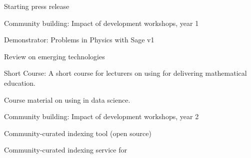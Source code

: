 \begin{workpackage}

\begin{wpdelivs}
\begin{wpdeliv}[due=6,miles=startup,id=press-release-1,dissem=PU,nature=DEC,lead=PS]{Starting press release}\end{wpdeliv}
 \begin{wpdeliv}[due=12,miles=startup,id=workshops-1,dissem=PU,nature=R,lead=PS]{Community building: Impact of development workshops, year 1}\end{wpdeliv}
  \begin{wpdeliv}[due=12,miles=startup,id=ibook3a,dissem=PU,nature=DEM,lead=US]{Demonstrator: Problems in Physics with Sage v1} \end{wpdeliv}
  \begin{wpdeliv}[due=12,miles=startup,id=techno,dissem=PU,nature=R,lead=PS]{Review on emerging technologies} \end{wpdeliv}
 \begin{wpdeliv}[due=18,miles=proto1,id=short-course,dissem=PU,nature=DEC,lead=USH]{Short Course: A short course for lecturers on using \TheProject for delivering mathematical education.}\end{wpdeliv}
 \begin{wpdeliv}[due=24,miles=proto1,id=datascience-course,dissem=PU,nature=DEC,lead=USH]{Course material on using \TheProject in data science.}
   \end{wpdeliv}
\begin{wpdeliv}[due=24,miles=proto1,id=workshops-2,dissem=PU,nature=R,lead=PS]{Community building: Impact of development workshops, year 2}\end{wpdeliv}
\begin{wpdeliv}[due=24,miles=proto1,id=ils-tool,dissem=PU,nature=P,lead=UV]{Community-curated
     indexing tool (open source)} \end{wpdeliv}
      \begin{wpdeliv}[due=24,miles=proto1,id=ils-service,dissem=PU,nature=DEM,lead=UV]{Community-curated
     indexing service for \TheProject} \end{wpdeliv}

\end{wpdelivs}
\end{workpackage}
